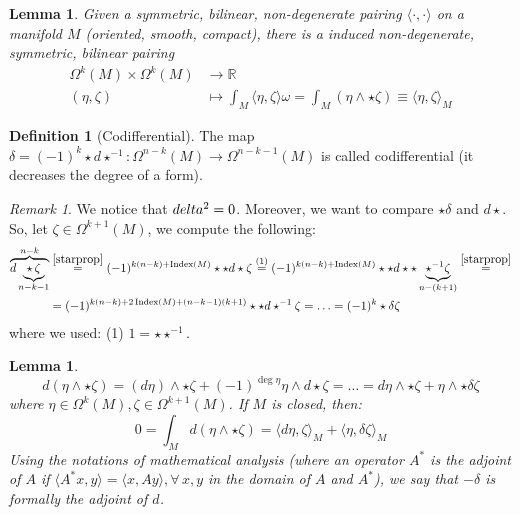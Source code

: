 \documentclass[a4paper,11pt,titlepage, article, oneside]{memoir}
\numberwithin{equation}{section}
\newtheorem{lemma}[theorem]{Lemma}
\theoremstyle{definition}
\newtheorem{definition}[theorem]{Definition}
\theoremstyle{remark}
\newtheorem{remark}[theorem]{Remark}
\DeclareMathOperator{\Index}{Index}
\newcommand{\rfield}{\mathbb{R}}
\begin{document}
\begin{lemma}
Given a symmetric, bilinear, non-degenerate pairing $\langle\cdot, \cdot \rangle$ on a manifold $M$ (oriented, smooth, compact), there is a induced non-degenerate, symmetric, bilinear pairing
\begin{align}
\Omega^k(M) \times \Omega^k(M) &\rightarrow \rfield \\
(\eta, \zeta) &\mapsto \int_M\langle \eta, \zeta \rangle \omega = \int_M (\eta \wedge \star \zeta) \equiv \langle \eta, \zeta \rangle_M \nonumber
\end{align}
 \end{lemma}
 
\begin{definition} [Codifferential]
The map $\delta = (-1)^k \star d \star^{-1} \colon \Omega^{n-k}(M) \rightarrow \Omega^{n-k-1}(M)$ is called codifferential (it decreases the degree of a form).
\end{definition}

\begin{remarkbox}\begin{remark}
We notice that $\\delta^2 = 0$. Moreover, we want to compare $\star \delta $ and $d \star$. So, let $\zeta \in \Omega^{k+1}(M)$, we compute the following:
\begin{align*}
\overbrace{d \underbrace{\star\, \zeta}_{n-k-1}}^{n-k} &\overset{\eqref{starprop}}{=} (-1)^{k(n-k) + \Index(M)} \star \star d \star \zeta \overset{(1)}{=} (-1)^{k(n-k) + \Index(M)} \star \star d \star \star \underbrace{\star^{-1} \zeta}_{n-(k+1)} \overset{\eqref{starprop}}{=} \\
&=(-1)^{k(n-k) + 2\Index(M) + (n-k-1)(k+1)} \star \star d \star^{-1} \zeta = \ldots = (-1)^k \star \delta \zeta
\end{align*}
where we used: (1) $1=\star \star^{-1}$.
\end{remark}\end{remarkbox}

\begin{lemma}
\begin{equation}
d(\eta \wedge \star \zeta) = (d\eta) \wedge \star \zeta + (-1)^{\deg \eta} \eta \wedge d \star \zeta = \ldots = d \eta \wedge \star \zeta + \eta \wedge \star \delta \zeta
\end{equation}
where $\eta \in \Omega^k(M), \zeta \in \Omega^{k+1}(M)$. If $M$ is closed, then:
\begin{equation}
0 = \int_M d(\eta \wedge \star \zeta) = \langle d \eta, \zeta \rangle_M + \langle \eta, \delta \zeta \rangle_M
\end{equation}
Using the notations of mathematical analysis (where an operator $A^*$ is the adjoint of $A$ if $\langle A^*x,  y \rangle = \langle x, Ay \rangle, \forall\, x, y  $ in the domain of $A$ and $A^*$), we say that $-\delta$ is formally the adjoint of $d$.
\end{lemma}
\end{document}
